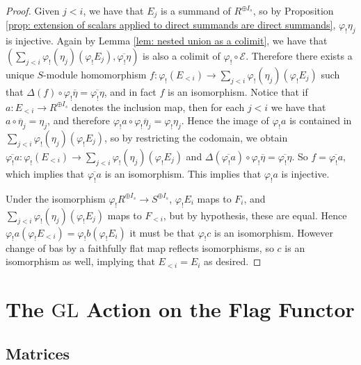 \documentclass[oneside,11pt]{amsart}
\newcommand{\mE}{\ensuremath{\mathcal{E}}}
\newcommand{\GL}{\ensuremath{\text{GL}}}
\theoremstyle{definition}
\newtheorem{proof techniques}{Proof Techniques}
\begin{document}
\begin{proof}
Given $j < i$, we have that $E_j$ is a summand of $R^{\oplus I_s}$, so by Proposition \ref{prop: extension of scalars applied to direct summands are direct summands}, $\varphi_! \eta_j$ is injective. Again by Lemma \ref{lem: nested union as a colimit}, we have that $(\sum_{j < i} \varphi_! (\eta_j) (\varphi_! E_j) , \overline{\varphi_! \eta})$ is also a colimit of $\varphi_! \circ \mE$. Therefore there exists a unique $S$-module homomorphism $f: \varphi_! (E_{<i}) \to \sum_{j < i} \varphi_! (\eta_j) (\varphi_! E_j)$ such that $\Delta(f) \circ \varphi_! \overline{\eta} = \overline{\varphi_! \eta}$, and in fact $f$ is an isomorphism. Notice that if $a : E_{<i} \to R^{\oplus I_s}$ denotes the inclusion map, then for each $j < i$ we have that $a \circ \overline{\eta}_j = \eta_j$, and therefore $\varphi_! a \circ \varphi_! \overline{\eta}_j = \varphi_! \eta_j$. Hence the image of $\varphi_! a$ is contained in $\sum_{j < i} \varphi_! (\eta_j) (\varphi_! E_j)$, so by restricting the codomain, we obtain $\overline{\varphi_! a} : \varphi_! (E_{<i}) \to \sum_{j < i} \varphi_! (\eta_j) (\varphi_! E_j)$ and $\Delta(\overline{\varphi_! a}) \circ \varphi_! \overline{\eta} = \overline{\varphi_! \eta}$. So $f = \overline{\varphi_! a}$, which implies that $\overline{\varphi_! a}$ is an isomorphism. This implies that $\varphi_! a$ is injective. 

Under the isomorphism $\varphi_! R^{\oplus I_s} \to S^{\oplus I_s}$, $\varphi_! E_i$ maps to $F_i$, and $\sum_{j < i} \varphi_! (\eta_j) (\varphi_! E_j)$ maps to $F_{<i}$, but by hypothesis, these are equal. Hence $\varphi_! a (\varphi_! E_{<i}) = \varphi_! b (\varphi_! E_i)$ it must be that $\varphi_! c$ is an isomorphism. However change of bas by a faithfully flat map reflects isomorphisms, so $c$ is an isomorphism as well, implying that $E_{<i}= E_i$ as desired.


\end{proof}



\section{The $\GL$ Action on the Flag Functor}



\subsection{Matrices} 
\end{document}
